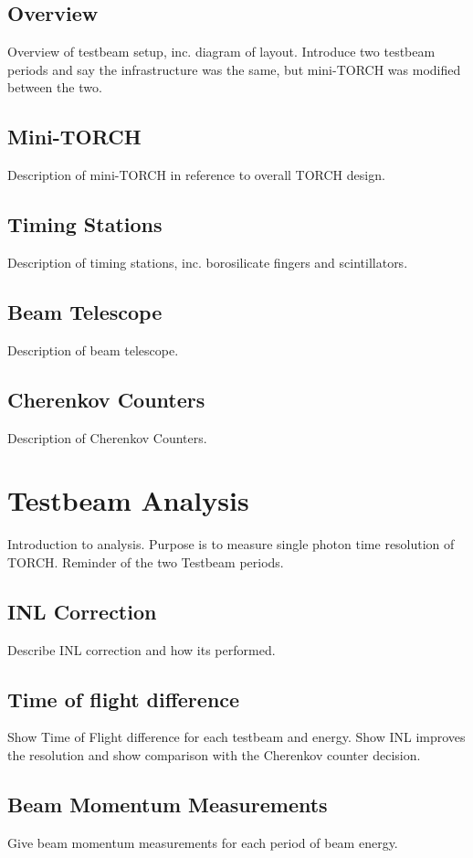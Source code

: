 \subsection{Overview}
Overview of testbeam setup, inc. diagram of layout. Introduce two testbeam periods and say the infrastructure was the same, but mini-TORCH was modified between the two.

\subsection{Mini-TORCH}
Description of mini-TORCH in reference to overall TORCH design.

\subsection{Timing Stations}
Description of timing stations, inc. borosilicate fingers and scintillators.

\subsection{Beam Telescope}
Description of beam telescope.

\subsection{Cherenkov Counters}
Description of Cherenkov Counters.

\section{Testbeam Analysis}
Introduction to analysis. Purpose is to measure single photon time resolution of TORCH. Reminder of the two Testbeam periods.

\subsection{INL Correction}
Describe INL correction and how its performed.

\subsection{Time of flight difference}
Show Time of Flight difference for each testbeam and energy. Show INL improves the resolution and show comparison with the Cherenkov counter decision.

\subsection{Beam Momentum Measurements}
Give beam momentum measurements for each period of beam energy.

